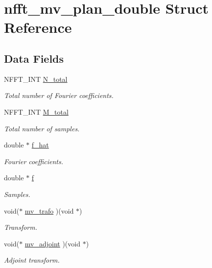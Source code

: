 \hypertarget{structnfft__mv__plan__double}{\section{nfft\-\_\-mv\-\_\-plan\-\_\-double Struct Reference}
\label{structnfft__mv__plan__double}
}
\subsection*{Data Fields}
\begin{DoxyCompactItemize}
\item 
N\-F\-F\-T\-\_\-\-I\-N\-T \hyperlink{structnfft__mv__plan__double_ad6971700948496aa968785426928432f}{N\-\_\-total}
\begin{DoxyCompactList}\small\item\em Total number of Fourier coefficients. \end{DoxyCompactList}\item 
N\-F\-F\-T\-\_\-\-I\-N\-T \hyperlink{structnfft__mv__plan__double_a7283df8048d60819c83d657060101485}{M\-\_\-total}
\begin{DoxyCompactList}\small\item\em Total number of samples. \end{DoxyCompactList}\item 
double $\ast$ \hyperlink{structnfft__mv__plan__double_a238489d7a63fda4fc9677f56894e3cac}{f\-\_\-hat}
\begin{DoxyCompactList}\small\item\em Fourier coefficients. \end{DoxyCompactList}\item 
double $\ast$ \hyperlink{structnfft__mv__plan__double_aa850d9ba71b761a31d3a95aa9581ea5e}{f}
\begin{DoxyCompactList}\small\item\em Samples. \end{DoxyCompactList}\item 
void($\ast$ \hyperlink{structnfft__mv__plan__double_a920771039e5cf889d6a29a243e6922e3}{mv\-\_\-trafo} )(void $\ast$)
\begin{DoxyCompactList}\small\item\em Transform. \end{DoxyCompactList}\item 
void($\ast$ \hyperlink{structnfft__mv__plan__double_a92e4080bcb7241befa250be9d8f9a1cd}{mv\-\_\-adjoint} )(void $\ast$)
\begin{DoxyCompactList}\small\item\em Adjoint transform. \end{DoxyCompactList}\end{DoxyCompactItemize}



